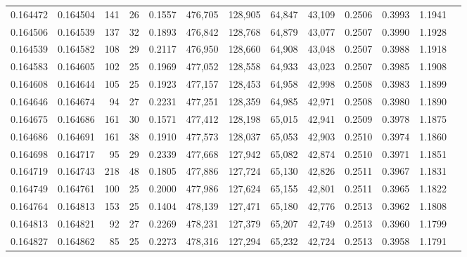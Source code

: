 \begin{tabular}{rrrrrrrrrrrrr}
0.164472 & 0.164504 &   141 &  26 &                                     0.1557 & 476,705 & 128,905 &  64,847 &  43,109 & 0.2506 & 0.3993 & 1.1941 \\
0.164506 & 0.164539 &   137 &  32 &                                     0.1893 & 476,842 & 128,768 &  64,879 &  43,077 & 0.2507 & 0.3990 & 1.1928 \\
0.164539 & 0.164582 &   108 &  29 &                                     0.2117 & 476,950 & 128,660 &  64,908 &  43,048 & 0.2507 & 0.3988 & 1.1918 \\
0.164583 & 0.164605 &   102 &  25 &                                     0.1969 & 477,052 & 128,558 &  64,933 &  43,023 & 0.2507 & 0.3985 & 1.1908 \\
0.164608 & 0.164644 &   105 &  25 &                                     0.1923 & 477,157 & 128,453 &  64,958 &  42,998 & 0.2508 & 0.3983 & 1.1899 \\
0.164646 & 0.164674 &    94 &  27 &                                     0.2231 & 477,251 & 128,359 &  64,985 &  42,971 & 0.2508 & 0.3980 & 1.1890 \\
0.164675 & 0.164686 &   161 &  30 &                                     0.1571 & 477,412 & 128,198 &  65,015 &  42,941 & 0.2509 & 0.3978 & 1.1875 \\
0.164686 & 0.164691 &   161 &  38 &                                     0.1910 & 477,573 & 128,037 &  65,053 &  42,903 & 0.2510 & 0.3974 & 1.1860 \\
0.164698 & 0.164717 &    95 &  29 &                                     0.2339 & 477,668 & 127,942 &  65,082 &  42,874 & 0.2510 & 0.3971 & 1.1851 \\
0.164719 & 0.164743 &   218 &  48 &                                     0.1805 & 477,886 & 127,724 &  65,130 &  42,826 & 0.2511 & 0.3967 & 1.1831 \\
0.164749 & 0.164761 &   100 &  25 &                                     0.2000 & 477,986 & 127,624 &  65,155 &  42,801 & 0.2511 & 0.3965 & 1.1822 \\
0.164764 & 0.164813 &   153 &  25 &                                     0.1404 & 478,139 & 127,471 &  65,180 &  42,776 & 0.2513 & 0.3962 & 1.1808 \\
0.164813 & 0.164821 &    92 &  27 &                                     0.2269 & 478,231 & 127,379 &  65,207 &  42,749 & 0.2513 & 0.3960 & 1.1799 \\
0.164827 & 0.164862 &    85 &  25 &                                     0.2273 & 478,316 & 127,294 &  65,232 &  42,724 & 0.2513 & 0.3958 & 1.1791 \\

\end{tabular}
